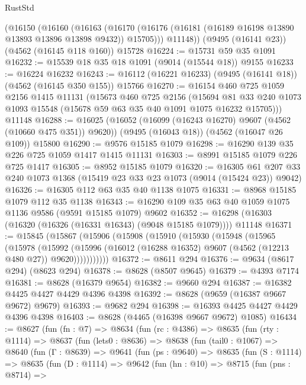 \begin{lexlean}{RustStd}
\begin{coremodule}
    (@16150
      (@16160
        (@16163 (@16170 (@16176 (@16181 (@16189 @16198 @13890 @13893 @13896 @13898 @9432)) @15705)))
        @11148))
    (@9495 (@16141 @23))
    (@4562 (@16145 @118 @160))
    @15728
@16224 := @15731 @59 @35 @1091
@16232 := @15539 @18 @35 @18 @1091 (@9014 (@15544 @18)) @9155
@16233 := @16224 @16232
@16243 := @16112 (@16221 @16233) (@9495 (@16141 @18)) (@4562 (@16145 @350 @155)) @15766
@16270 := @16154
    @460
    @725
    @1059
    @2156
    @1415
    @11131
    (@15673
      @460
      @725
      @2156
      (@15694 @81 @33 @240 @1073 @1093 @15548 (@15678 @59 @63 @35 @40 @1091 @1075 @16232 @15705)))
    @11148
@16288 := @16025
    (@16052 (@16099 (@16243 @16270) @9607 (@4562 (@10660 @475 @351)) @9620))
    (@9495 (@16043 @18))
    (@4562 (@16047 @26 @109))
    @15800
@16290 := @9576 @15185 @1079
@16298 := @16290 @139 @35 @226 @725 @1059 @1417 @1415 @11131
@16303 := @8991 @15185 @1079 @226 @725 @1417
@16305 := @8952 @15185 @1079
@16320 := @16305 @61 @207 @33 @240 @1073 @1368 (@15419 @23 @33 @23 @1073 (@9014 (@15424 @23)) @9042)
@16326 := @16305 @112 @63 @35 @40 @1138 @1075
@16331 := @8968 @15185 @1079 @112 @35 @1138
@16343 := @16290 @109 @35 @63 @40 @1059 @1075 @1136 @9586 (@9591 @15185 @1079) @9602
@16352 := @16298 (@16303 (@16320 (@16326 (@16331 @16343) (@9048 @15185 @1079)))) @11148
@16371 := @15845
    (@15867
      (@15906
        (@15908
          (@15910
            (@15930
              (@15948
                (@15965
                  (@15978
                    (@15992
                      (@15996
                        (@16012 (@16288 @16352) @9607 (@4562 (@12213 @480 @27)) @9620)))))))))))
@16372 := @8611 @294
@16376 := @9634 (@8617 @294) (@8623 @294)
@16378 := @8628 (@8507 @9645)
@16379 := @4393 @7174
@16381 := @8628 (@16379 @9654)
@16382 := @9660 @294
@16387 := @16382 @4425 @4427 @4429 @4396 @4398
@16392 := @8628 (@9659 (@16387 @9667 @9672) @9679)
@16393 := @9682 @294
@16398 := @16393 @4425 @4427 @4429 @4396 @4398
@16403 := @8628 (@4465 (@16398 @9667 @9672) @1085)
@16434 := @8627
    (fun (fn : @7) =>
    @8634
      (fun (rc : @4386) =>
      @8635
        (fun (rty : @1114) =>
        @8637
          (fun (lets0 : @8636) =>
          @8638
            (fun (tail0 : @1067) =>
            @8640
              (fun (Γ : @8639) =>
              @9641
                (fun (ps : @9640) =>
                @8635
                  (fun (S : @1114) =>
                  @8635
                    (fun (D : @1114) =>
                    @9642
                      (fun (hn : @10) =>
                      @8715
                        (fun (pns : @8714) =>

\end{coremodule}
\end{lexlean}

